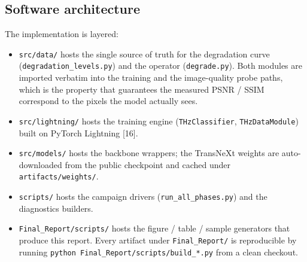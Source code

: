 \subsection{Software architecture}
\label{sec:design:sw}

The implementation is layered:

\begin{itemize}
  \item \texttt{src/data/} hosts the single source of truth for the
        degradation curve (\texttt{degradation\_levels.py}) and the operator
        (\texttt{degrade.py}). Both modules are imported verbatim into the
        training and the image-quality probe paths, which is the property
        that guarantees the measured PSNR / SSIM correspond to the pixels
        the model actually sees.
  \item \texttt{src/lightning/} hosts the training engine
        (\texttt{THzClassifier}, \texttt{THzDataModule}) built on PyTorch
        Lightning [16].
  \item \texttt{src/models/} hosts the backbone wrappers; the TransNeXt
        weights are auto-downloaded from the public checkpoint and cached
        under \texttt{artifacts/weights/}.
  \item \texttt{scripts/} hosts the campaign drivers
        (\texttt{run\_all\_phases.py}) and the diagnostics builders.
  \item \texttt{Final\_Report/scripts/} hosts the figure / table / sample
        generators that produce this report. Every artifact under
        \texttt{Final\_Report/} is reproducible by running
        \texttt{python Final\_Report/scripts/build\_*.py} from a clean
        checkout.
\end{itemize}
